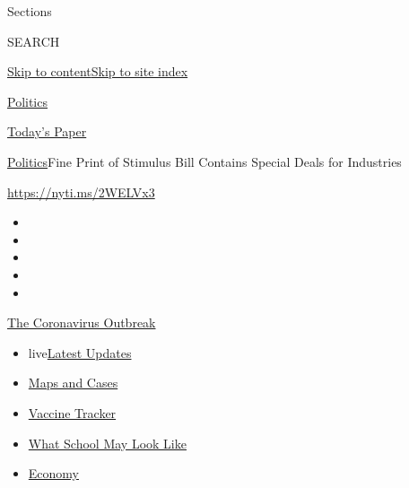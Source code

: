 Sections

SEARCH

\protect\hyperlink{site-content}{Skip to
content}\protect\hyperlink{site-index}{Skip to site index}

\href{https://www.nytimes.com/section/politics}{Politics}

\href{https://myaccount.nytimes.com/auth/login?response_type=cookie\&client_id=vi}{}

\href{https://www.nytimes.com/section/todayspaper}{Today's Paper}

\href{/section/politics}{Politics}\textbar{}Fine Print of Stimulus Bill
Contains Special Deals for Industries

\url{https://nyti.ms/2WELVx3}

\begin{itemize}
\item
\item
\item
\item
\item
\end{itemize}

\href{https://www.nytimes.com/news-event/coronavirus?action=click\&pgtype=Article\&state=default\&region=TOP_BANNER\&context=storylines_menu}{The
Coronavirus Outbreak}

\begin{itemize}
\tightlist
\item
  live\href{https://www.nytimes.com/2020/08/01/world/coronavirus-covid-19.html?action=click\&pgtype=Article\&state=default\&region=TOP_BANNER\&context=storylines_menu}{Latest
  Updates}
\item
  \href{https://www.nytimes.com/interactive/2020/us/coronavirus-us-cases.html?action=click\&pgtype=Article\&state=default\&region=TOP_BANNER\&context=storylines_menu}{Maps
  and Cases}
\item
  \href{https://www.nytimes.com/interactive/2020/science/coronavirus-vaccine-tracker.html?action=click\&pgtype=Article\&state=default\&region=TOP_BANNER\&context=storylines_menu}{Vaccine
  Tracker}
\item
  \href{https://www.nytimes.com/interactive/2020/07/29/us/schools-reopening-coronavirus.html?action=click\&pgtype=Article\&state=default\&region=TOP_BANNER\&context=storylines_menu}{What
  School May Look Like}
\item
  \href{https://www.nytimes.com/live/2020/07/31/business/stock-market-today-coronavirus?action=click\&pgtype=Article\&state=default\&region=TOP_BANNER\&context=storylines_menu}{Economy}
\end{itemize}

